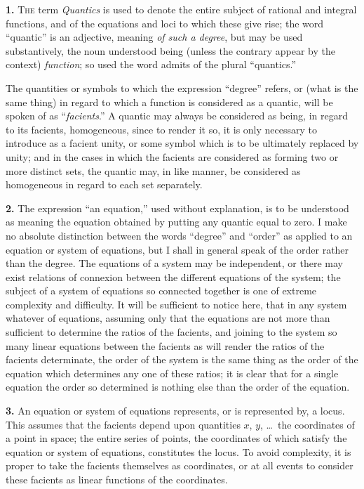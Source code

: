 \documentclass[11pt,a4paper]{book}
\begin{document}
\textbf{1.} \textsc{The} term \textit{Quantics} is used to denote the entire subject of rational and integral functions, and of the equations and loci to which these give rise; the word ``quantic'' is an adjective, meaning \textit{of such a degree}, but may be used substantively, the noun understood being (unless the contrary appear by the context) \textit{function}; so used the word admits of the plural ``quantics.''

The quantities or symbols to which the expression ``degree'' refers, or (what is the same thing) in regard to which a function is considered as a quantic, will be spoken of as ``\textit{facients}.'' A quantic may always be considered as being, in regard to its facients, homogeneous, since to render it so, it is only necessary to introduce as a facient unity, or some symbol which is to be ultimately replaced by unity; and in the cases in which the facients are considered as forming two or more distinct sets, the quantic may, in like manner, be considered as homogeneous in regard to each set separately.

\textbf{2.} The expression ``an equation,'' used without explanation, is to be understood as meaning the equation obtained by putting any quantic equal to zero. I make no absolute distinction between the words ``degree'' and ``order'' as applied to an equation or system of equations, but I shall in general speak of the order rather than the degree. The equations of a system may be independent, or there may exist relations of connexion between the different equations of the system; the subject of a system of equations so connected together is one of extreme complexity and difficulty. It will be sufficient to notice here, that in any system whatever of equations, assuming only that the equations are not more than sufficient to determine the ratios of the facients, and joining to the system so many linear equations between the facients as will render the ratios of the facients determinate, the order of the system is the same thing as the order of the equation which determines any one of these ratios; it is clear that for a single equation the order so determined is nothing else than the order of the equation.

\newpage
\setcounter{page}{222}

\textbf{3.} An equation or system of equations represents, or is represented by, a locus. This assumes that the facients depend upon quantities $x$, $y$, \ldots\ the coordinates of a point in space; the entire series of points, the coordinates of which satisfy the equation or system of equations, constitutes the locus. To avoid complexity, it is proper to take the facients themselves as coordinates, or at all events to consider these facients as linear functions of the coordinates.
\end{document}
